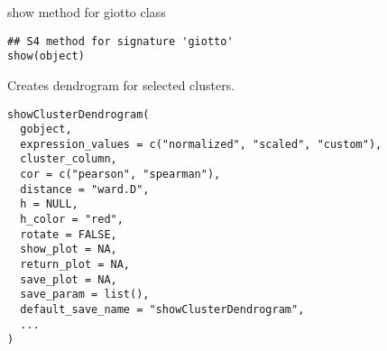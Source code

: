\documentclass[a4paper]{book}
\begin{document}
%
\begin{Description}\relax
show method for giotto class
\end{Description}
%
\begin{Usage}
\begin{verbatim}
## S4 method for signature 'giotto'
show(object)
\end{verbatim}
\end{Usage}
%
\begin{Description}\relax
Creates dendrogram for selected clusters.
\end{Description}
%
\begin{Usage}
\begin{verbatim}
showClusterDendrogram(
  gobject,
  expression_values = c("normalized", "scaled", "custom"),
  cluster_column,
  cor = c("pearson", "spearman"),
  distance = "ward.D",
  h = NULL,
  h_color = "red",
  rotate = FALSE,
  show_plot = NA,
  return_plot = NA,
  save_plot = NA,
  save_param = list(),
  default_save_name = "showClusterDendrogram",
  ...
)
\end{verbatim}
\end{Usage}
%
\end{document}
